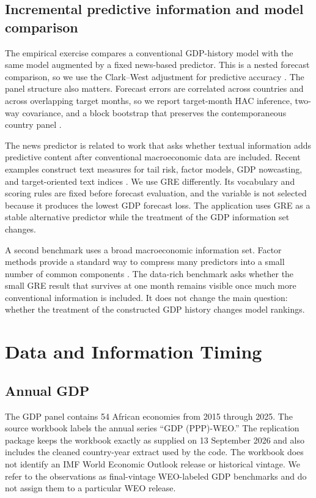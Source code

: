 \documentclass[preprint,12pt,authoryear]{elsarticle}
\begin{document}
\subsection{Incremental predictive information and model comparison}

The empirical exercise compares a conventional GDP-history model with the same model augmented by a fixed news-based predictor. This is a nested forecast comparison, so we use the Clark--West adjustment for predictive accuracy \citep{clarkwest2007}. The panel structure also matters. Forecast errors are correlated across countries and across overlapping target months, so we report target-month HAC inference, two-way covariance, and a block bootstrap that preserves the contemporaneous country panel \citep{qu2024,akgun2024,coroneo2025}.

The news predictor is related to work that asks whether textual information adds predictive content after conventional macroeconomic data are included. Recent examples construct text measures for tail risk, factor models, GDP nowcasting, and target-oriented text indices \citep{adaemmer2025,seo2025,zheng2024,ardia2026}. We use GRE differently. Its vocabulary and scoring rules are fixed before forecast evaluation, and the variable is not selected because it produces the lowest GDP forecast loss. The application uses GRE as a stable alternative predictor while the treatment of the GDP information set changes.

A second benchmark uses a broad macroeconomic information set. Factor methods provide a standard way to compress many predictors into a small number of common components \citep{stockwatson2002}. The data-rich benchmark asks whether the small GRE result that survives at one month remains visible once much more conventional information is included. It does not change the main question: whether the treatment of the constructed GDP history changes model rankings.
\section{Data and Information Timing}\label{sec:data}

\subsection{Annual GDP}

The GDP panel contains 54 African economies from 2015 through 2025. The source workbook labels the annual series ``GDP (PPP)-WEO.'' The replication package keeps the workbook exactly as supplied on 13 September 2026 and also includes the cleaned country-year extract used by the code. The workbook does not identify an IMF World Economic Outlook release or historical vintage. We refer to the observations as final-vintage WEO-labeled GDP benchmarks and do not assign them to a particular WEO release.
\end{document}
